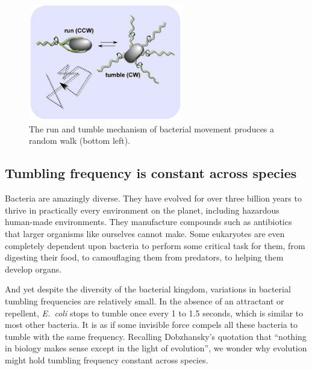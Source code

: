 \begin{figure}[h]
\centering
\mySfFamily
\includegraphics[width = 0.6\textwidth]{../images/chemotaxis_intro_runtumble.png}
\caption{The run and tumble mechanism of bacterial movement produces a random walk (bottom left).}
\label{fig:chemotaxis_intro_runtumble}
\end{figure}

\begin{qbox}\end{qbox}

\FloatBarrier
{}
\subsection{Tumbling frequency is constant across species}

Bacteria are amazingly diverse. They have evolved for over three billion years to thrive in practically every environment on the planet, including hazardous human-made environments. They manufacture compounds such as antibiotics that larger organisms like ourselves cannot make. Some eukaryotes are even completely dependent upon bacteria to perform some critical task for them, from digesting their food, to camouflaging them from predators, to helping them develop organs.

And yet despite the diversity of the bacterial kingdom, variations in bacterial tumbling frequencies are relatively small. In the absence of an attractant or repellent, \textit{E.~coli} stops to tumble once every 1 to 1.5 seconds, which is similar to most other bacteria. It is as if some invisible force compels all these bacteria to tumble with the same frequency. Recalling Dobzhansky's quotation that ``nothing in biology makes sense except in the light of evolution'', we wonder why evolution might hold tumbling frequency constant across species.

